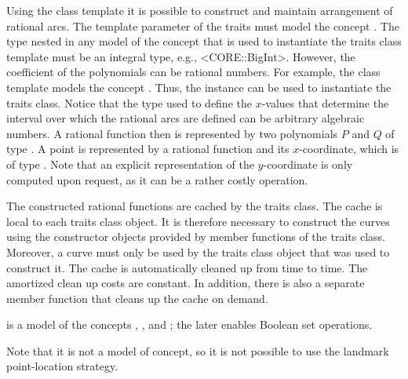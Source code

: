 Using the 
class template it is possible to construct and maintain arrangement
of rational arcs. The template parameter of the traits must model
the concept . The type
 nested in any model of the concept
 that is used to instantiate
the traits class template must be an integral type, e.g.,
<CORE::BigInt>. However, the coefficient of the polynomials can be
rational numbers. For example, the 
class template models the concept . Thus,
the instance  can be used to
instantiate the traits class. Notice that the type
 used to define the $x$-values that
determine the interval over which the rational arcs are defined can
be arbitrary algebraic numbers. A rational function then is represented
by two polynomials $P$ and $Q$ of type
. A point is represented by a
rational function and its $x$-coordinate, which is of type
. Note that an explicit
representation of the $y$-coordinate is only computed upon request, as
it can be a rather costly operation. 

The constructed rational functions are cached by the traits class. 
The cache is local to each traits class object. 
It is therefore necessary to construct the curves using the constructor 
objects provided by member functions of the traits class. 
Moreover, a curve must only be used by the traits class object that was 
used to construct it. 
The cache is automatically  cleaned up from time to time.
The amortized clean up costs are constant. 
In addition, there is also a 
separate member function that cleans up the cache on demand.  


 is a model of 
the concepts , ,
and ; 
the later enables Boolean set operations. 

Note that it is not a model of   concept,
so it is not possible to use the landmark point-location strategy.

